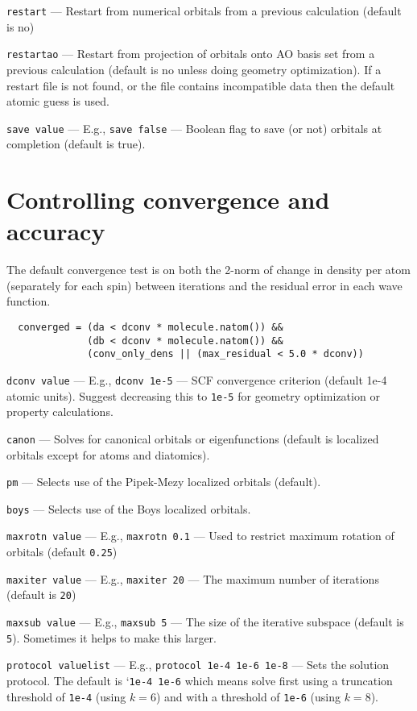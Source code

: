 \documentclass[letterpaper]{book}
\begin{document}
{\tt restart} --- Restart from numerical orbitals from a previous calculation (default is no)

{\tt restartao} --- Restart from projection of orbitals onto AO basis
set from a previous calculation (default is no unless doing geometry
optimization).  If a restart file is not found, or the file contains
incompatible data then the default atomic guess is used.

{\tt save value} --- E.g., {\tt save false} --- Boolean flag to save (or not) orbitals at completion (default is true).

\section{Controlling convergence and accuracy}

The default convergence test is on both the 2-norm of change in density per atom (separately for each spin) between iterations and the residual error in each wave function.

\begin{verbatim}
  converged = (da < dconv * molecule.natom()) && 
              (db < dconv * molecule.natom()) &&
              (conv_only_dens || (max_residual < 5.0 * dconv))
\end{verbatim}

{\tt dconv value} --- E.g., {\tt dconv 1e-5} --- SCF convergence criterion (default 1e-4 atomic units).  Suggest decreasing this to {\tt 1e-5} for geometry optimization or property calculations.

{\tt canon} --- Solves for canonical orbitals or eigenfunctions (default is localized orbitals except for atoms and diatomics).

{\tt pm} --- Selects use of the Pipek-Mezy localized orbitals (default).

{\tt boys} --- Selects use of the Boys localized orbitals.

{\tt maxrotn value} --- E.g., {\tt maxrotn 0.1} --- Used to restrict maximum rotation of orbitals (default {\tt 0.25})

{\tt maxiter value} --- E.g., {\tt maxiter 20} --- The maximum number of iterations (default is {\tt 20})

{\tt maxsub value} --- E.g., {\tt maxsub 5} --- The size of the iterative subspace (default is {\tt 5}).  Sometimes it helps to make this larger.

{\tt protocol valuelist} --- E.g., {\tt protocol 1e-4 1e-6 1e-8} --- Sets the solution protocol.  The default is `{\tt 1e-4 1e-6} which means solve first using a truncation threshold of {\tt 1e-4} (using $k=6$) and with a threshold of {\tt 1e-6} (using $k=8$).
\end{document}
